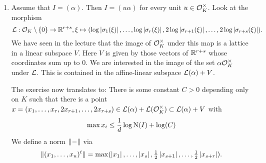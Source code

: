 \documentclass[a4paper,11pt]{article}
\begin{document}
\begin{enumerate}[wide, labelindent=0pt]
    \item Assume that $I = (\alpha)$.
        Then $I = (u \alpha)$ for every unit $u \in \mathcal{O}_K^\times$. Look at the morphism
        \begin{equation*}
            \mathcal{L}: \mathcal{O}_K\setminus \{0\} \to \mathbb{R}^{r+s}, 
            \xi \mapsto (\log \left\lvert \sigma_1(\xi) \right\rvert, \dots, \log \left\lvert \sigma_r(\xi) \right\rvert, 
            2\log \left\lvert \sigma_{r+1}(\xi) \right\rvert, \dots, 2 \log \left\lvert \sigma_{r+s}(\xi) \right\rvert).
        \end{equation*}
        We have seen in the lecture that the image of $\mathcal{O}_K^\times$ under this map 
        is a lattice in a linear subspace $V$. Here $V$ is given by those vectors
        of $\mathbb{R}^{r+s}$ whose coordinates sum up to $0$. We are interested
        in the image of the set $\alpha \mathcal{O}_K^\times$ under $\mathcal{L}$. This is contained
        in the affine-linear subspace $\mathcal{L}(\alpha) + V$. 
        
        The exercise now translates to: There is some constant $C > 0$ depending only
        on $K$ such that there is a point $x = (x_1, \dots, x_r, 2x_{r+1}, \dots,
        2x_{r+s}) \in \mathcal{L}(\alpha) + \mathcal{L}(\mathcal{O}_K^\times) \subset \mathcal{L}(\alpha)+V$ with 
        \begin{equation*}
             \max x_i \leq \frac 1d \log \operatorname{N}(I) + \log(C)
        \end{equation*}
        We define a norm $\lVert-\rVert$ via 
        \begin{equation*}
            \lVert(x_1, \dots, x_n)^t \rVert = \max (\left\lvert x_1 \right\rvert, \dots, \left\lvert x_s \right\rvert,
            \tfrac 12 \left\lvert x_{s+1} \right\rvert, \dots, \tfrac 12 \left\lvert x_{s+r} \right\rvert).
        \end{equation*}


\end{enumerate}
\end{document}
